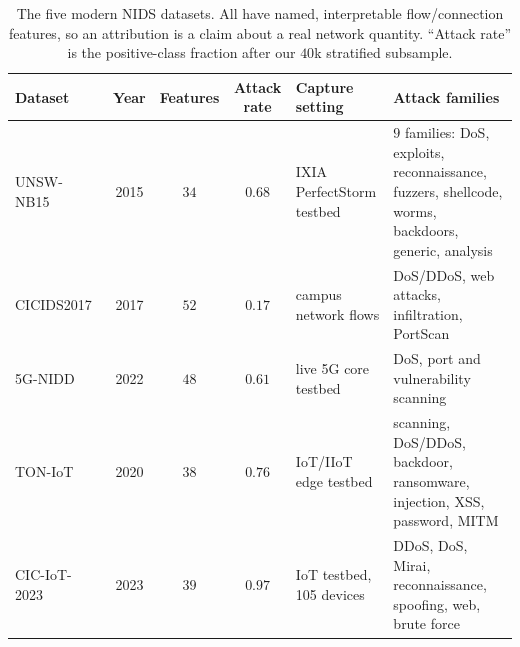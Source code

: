 \documentclass[conference]{IEEEtran}
\begin{document}
\begin{table}[t]
\centering
\caption{The five modern NIDS datasets. All have named, interpretable flow/connection features,
so an attribution is a claim about a real network quantity. ``Attack rate'' is the
positive-class fraction after our $40$k stratified subsample.}
\label{tab:data}
\small\setlength{\tabcolsep}{6pt}
\begin{tabular}{lcccl p{5.8cm}}
\toprule
Dataset & Year & Features & Attack rate & Capture setting & Attack families \\
\midrule
UNSW-NB15~\cite{unsw2015}        & 2015 & $34$ & $0.68$ & IXIA PerfectStorm testbed & $9$ families: DoS, exploits, reconnaissance, fuzzers, shellcode, worms, backdoors, generic, analysis \\
CICIDS2017~\cite{cicids2017,engelen2021} & 2017 & $52$ & $0.17$ & campus network flows & DoS/DDoS, web attacks, infiltration, PortScan \\
5G-NIDD~\cite{g5nidd}            & 2022 & $48$ & $0.61$ & live 5G core testbed & DoS, port and vulnerability scanning \\
TON-IoT~\cite{toniot2020}        & 2020 & $38$ & $0.76$ & IoT/IIoT edge testbed & scanning, DoS/DDoS, backdoor, ransomware, injection, XSS, password, MITM \\
CIC-IoT-2023~\cite{ciciot2023}   & 2023 & $39$ & $0.97$ & IoT testbed, 105 devices & DDoS, DoS, Mirai, reconnaissance, spoofing, web, brute force \\
\bottomrule
\end{tabular}
\end{table}
\end{document}
